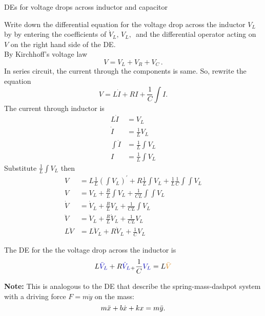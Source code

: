\begin{exercise}
  DEs for voltage drops across inductor and capacitor
\end{exercise}

Write down the differential equation for
the voltage drop across the inductor $V _L$ by by entering the coefficients of
$\dot V _L, \,  V _L,\,$ and the differential operator acting on $V$ on the right hand side of the DE.\\
By Kirchhoff's voltage law
\begin{equation*}
  V=V_ L+V_ R+V_ C\, .
\end{equation*}
In series circuit, the current through the components is same.
So, rewrite the equation
\begin{equation*}
  V= L \dot I + R I + \frac{1}{C} \int I.
\end{equation*}
The current through inductor is
\begin{align*}
  L \dot I &= V _L \\
  \dot I &= \frac{1}{L} V _L \\
  \int \dot I &= \frac{1}{L} \int V _L \\
  I &= \frac{1}{L} \int V _L
\end{align*}
Substitute $\frac{1}{L} \int V _L$ then
\begin{align*}
  V &= L \frac{1}{L}  (\int V _L)^{\prime} + R \frac{1}{L} \int V _L +
      \frac{1}{L} \frac{1}{C} \int \int V _L \\
  V &= V _L + \frac{R}{L} \int V _L + \frac{1}{CL}  \int \int V _L \\
  \dot V &=  \dot V _L + \frac{R}{L} V _L + \frac{1}{CL}  \int V _L \\
  \ddot V &=  \ddot V _L + \frac{R}{L} \dot V _L + \frac{1}{CL} V _L \\
  L \ddot V &=  L \ddot V _L + R \dot V _L + \frac{1}{C} V _L 
\end{align*}

The DE for the the voltage drop across the inductor is
\begin{equation*}
  \displaystyle  L{\color{blue}{\ddot{V}_ L}} +
  R{\color{blue}{\dot{V}_ L}} _+\frac{1}{C} {\color{blue}{V_ L}}
  \displaystyle =
  \displaystyle  L{\color{orange}{\ddot V}}
\end{equation*}

\textbf{Note:} This is analogous to the DE that describe the spring-mass-dashpot system with a
driving force $F= m \ddot y$ on the mass:
\begin{equation*}
  \displaystyle  \displaystyle m\ddot{x}+b\dot{x}+kx
  \displaystyle = \displaystyle \displaystyle  m\ddot{y}.  
\end{equation*}

